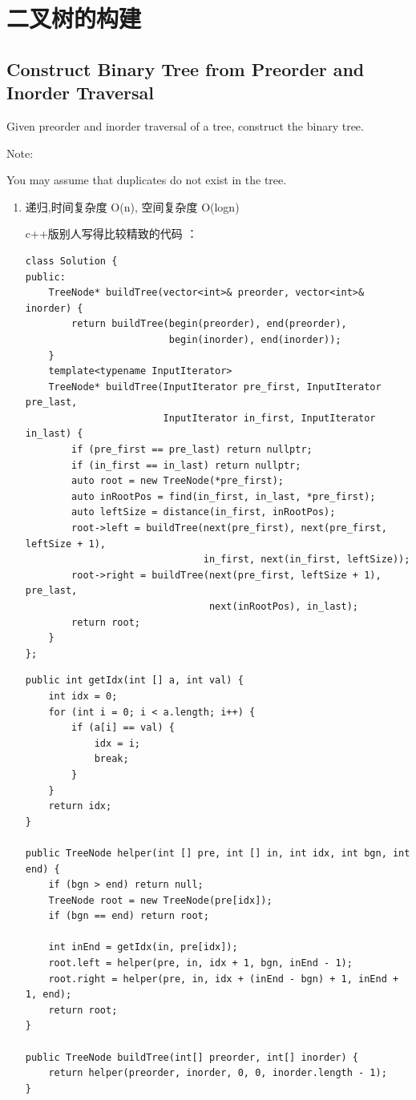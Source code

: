 \documentclass[12pt]{book}
\begin{document}
\section{二叉树的构建}
\label{sec-4-3}
\subsection{Construct Binary Tree from Preorder and Inorder Traversal}
\label{sec-4-3-1}
Given preorder and inorder traversal of a tree, construct the binary tree.

Note:

You may assume that duplicates do not exist in the tree.

\begin{enumerate}
\item 递归,时间复杂度 O(n), 空间复杂度 O(logn)
\label{sec-4-3-1-1}

c++版别人写得比较精致的代码 ： 

\lstset{language=java,label= ,caption= ,numbers=none}
\begin{lstlisting}
class Solution {
public:
    TreeNode* buildTree(vector<int>& preorder, vector<int>& inorder) {
        return buildTree(begin(preorder), end(preorder),
                         begin(inorder), end(inorder));
    }
    template<typename InputIterator>
    TreeNode* buildTree(InputIterator pre_first, InputIterator pre_last,
                        InputIterator in_first, InputIterator in_last) {
        if (pre_first == pre_last) return nullptr;
        if (in_first == in_last) return nullptr;
        auto root = new TreeNode(*pre_first);
        auto inRootPos = find(in_first, in_last, *pre_first);
        auto leftSize = distance(in_first, inRootPos);
        root->left = buildTree(next(pre_first), next(pre_first, leftSize + 1),
                               in_first, next(in_first, leftSize));
        root->right = buildTree(next(pre_first, leftSize + 1), pre_last,
                                next(inRootPos), in_last);
        return root;
    }
};
\end{lstlisting}

\lstset{language=java,label= ,caption= ,numbers=none}
\begin{lstlisting}
public int getIdx(int [] a, int val) {
    int idx = 0;
    for (int i = 0; i < a.length; i++) {
        if (a[i] == val) {
            idx = i;
            break;
        }
    }
    return idx;
}

public TreeNode helper(int [] pre, int [] in, int idx, int bgn, int end) {
    if (bgn > end) return null;
    TreeNode root = new TreeNode(pre[idx]);
    if (bgn == end) return root;

    int inEnd = getIdx(in, pre[idx]);
    root.left = helper(pre, in, idx + 1, bgn, inEnd - 1);
    root.right = helper(pre, in, idx + (inEnd - bgn) + 1, inEnd + 1, end);
    return root;
}

public TreeNode buildTree(int[] preorder, int[] inorder) {
    return helper(preorder, inorder, 0, 0, inorder.length - 1);
}
\end{lstlisting}
\end{enumerate}
\end{document}
